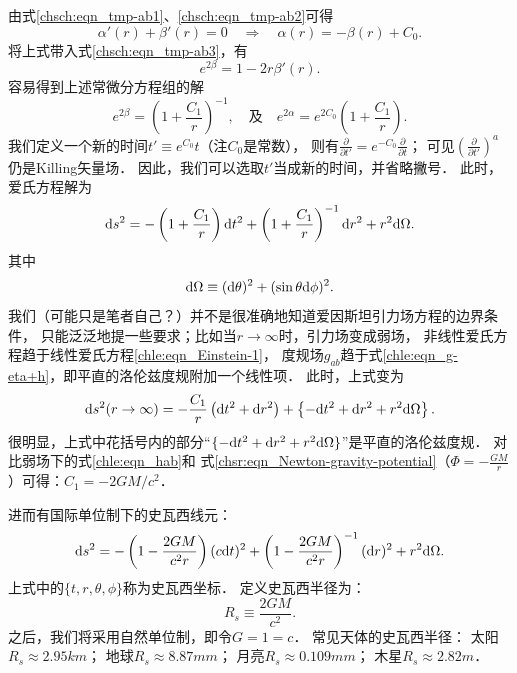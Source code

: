 由式\eqref{chsch:eqn_tmp-ab1}、\eqref{chsch:eqn_tmp-ab2}可得
\begin{equation}\label{chsch:eqn_apb=0}
    \alpha'(r) + \beta'(r)=0 \quad \Rightarrow \quad
    \alpha(r)= -\beta(r) + C_0 .
\end{equation}
将上式带入式\eqref{chsch:eqn_tmp-ab3}，有
\begin{equation}
    e^{2\beta} = 1-2r \beta'(r) .
\end{equation}
容易得到上述常微分方程组的解
\begin{equation}\label{chsch:eqn_ab0}
    e^{2\beta}  = \left(1+\frac{C_1}{r}\right)^{-1} , \quad \text{及} \quad 
    e^{2\alpha} = e^{2C_0} \left(1+\frac{C_1}{r}\right) .
\end{equation}
我们定义一个新的时间$t'\equiv e^{C_0} t$（注$C_0$是常数），
则有$\frac{\partial }{\partial t'}=e^{-C_0}\frac{\partial }{\partial t}$；
可见$(\frac{\partial }{\partial t'})^a$仍是Killing矢量场．
因此，我们可以选取$t'$当成新的{\kaishu 时间}，并省略撇号．
此时，爱氏方程解为
\begin{equation}
    {\rm d}s^2 = -\left(1+\frac{C_1}{r}\right) {\rm d}t^2
    + \left(1+\frac{C_1}{r}\right)^{-1} {\rm d}r^2
    + r^2 {\rm d}\Omega.
\end{equation}
其中
\begin{equation}\label{chsch:eqn_dOmega}
    {\rm d}\Omega\equiv({\rm d}\theta)^2 + (\sin\theta {\rm d}\phi)^2 .
\end{equation}
我们（可能只是笔者自己？）并不是很准确地知道爱因斯坦引力场方程的边界条件，
只能泛泛地提一些要求；比如当$r\to \infty$时，引力场变成弱场，
非线性爱氏方程趋于线性爱氏方程\eqref{chle:eqn_Einstein-1}，
度规场$g_{ab}$趋于式\eqref{chle:eqn_g-eta+h}，即平直的洛伦兹度规附加一个线性项．
此时，上式变为
\begin{equation}
    {\rm d}s^2(r\to \infty) = -\frac{C_1}{r}\left( {\rm d}t^2 +{\rm d}r^2 \right)  
    + \left\{{-\rm d}t^2 + {\rm d}r^2+r^2 {\rm d}\Omega \right\}.
\end{equation}
很明显，上式中花括号内的部分“$\{{-\rm d}t^2 + {\rm d}r^2+r^2 {\rm d}\Omega \}$”是平直的洛伦兹度规．
对比弱场下的式\eqref{chle:eqn_hab}和
式\eqref{chsr:eqn_Newton-gravity-potential}（$\Phi=-\frac{GM}{r}$）可得：$C_1=-2GM/c^2$．

进而有国际单位制下的{\heiti 史瓦西线元}：
\begin{equation}\label{chsch:eqn_Schw-metric}
    {\rm d}s^2 = - \left(1-\frac{2G M}{c^2 r}\right) (c{\rm d}t)^2
    + \left(1-\frac{2G M}{c^2 r}\right)^{-1} ({\rm d}r)^2
    + r^2 {\rm d}\Omega.
\end{equation}
上式中的$\{t,r,\theta,\phi\}$称为{\heiti 史瓦西坐标}．
定义{\heiti 史瓦西半径}为：
\begin{equation}\label{chsch:eqn_Schw-radius}
    R_s \equiv \frac{2G M}{c^2} .
\end{equation}
之后，我们将采用自然单位制，即令$G=1=c$．
常见天体的史瓦西半径：
太阳$R_s\approx 2.95 \si{km}$；
地球$R_s\approx 8.87 \si{mm}$；
月亮$R_s\approx 0.109 \si{mm}$；
木星$R_s\approx 2.82 \si{m}$．


